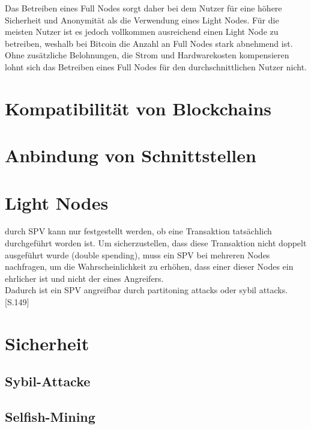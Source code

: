 Das Betreiben eines Full Nodes sorgt daher bei dem Nutzer für eine höhere Sicherheit und Anonymität als die Verwendung eines Light Nodes. Für die meisten Nutzer ist es jedoch vollkommen ausreichend einen Light Node zu betreiben, weshalb bei Bitcoin die Anzahl an Full Nodes stark abnehmend ist. Ohne zusätzliche Belohnungen, die Strom und Hardwarekosten kompensieren lohnt sich das Betreiben eines Full Nodes für den durchschnittlichen Nutzer nicht.
\section{Kompatibilität von Blockchains}
\section{Anbindung von Schnittstellen}
\section{Light Nodes}
durch \ac{SPV} kann nur festgestellt werden, ob eine Transaktion tatsächlich durchgeführt worden ist. Um sicherzustellen, dass diese Transaktion nicht doppelt ausgeführt wurde (double spending), muss ein \ac{SPV} bei mehreren Nodes nachfragen, um die Wahrscheinlichkeit zu erhöhen, dass einer dieser Nodes ein ehrlicher ist und nicht der eines Angreifers. \\
Dadurch ist ein \ac{SPV} angreifbar durch partitoning attacks oder sybil attacks. \cite{Antonopoulos.2015}[S.149]
\section{Sicherheit}
\subsection{Sybil-Attacke}
\subsection{Selfish-Mining}
